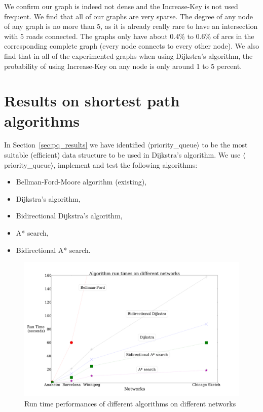 We confirm our graph is indeed not dense and the Increase-Key is not used frequent.
We find that all of our graphs are very sparse.
The degree of any node of any graph is no more than 5,
as it is already really rare to have an intersection with 5 roads connected.
The graphs only have about 0.4\% to 0.6\% of arcs in the corresponding complete graph (every node connects to every other node).
We also find that in all of the experimented graphs when using Dijkstra's algorithm,
the probability of using Increase-Key on any node is only around 1 to 5 percent.

\section{Results on shortest path algorithms} \label{sec:allresults}
In Section~\ref{sec:pq_results} we have identified  $\langle$priority\_queue$\rangle$ to be the most suitable (efficient) data structure to be used in Dijkstra's algorithm.
We use $\langle$priority\_queue$\rangle$, implement and test the following algorithms:
\begin{itemize}
        \item Bellman-Ford-Moore algorithm (existing),
        \item Dijkstra's algorithm,
        \item Bidirectional Dijkstra's algorithm,
        \item A* search,
        \item Bidirectional A* search.
\end{itemize}
\begin{figure}[!ht]
    \centering
    \includegraphics[trim=0 2em 0 10em, clip, width=\textwidth]{img/runtime}
    \caption{Run time performances of different algorithms on different networks}
    \label{fig:allresults}
\end{figure}

